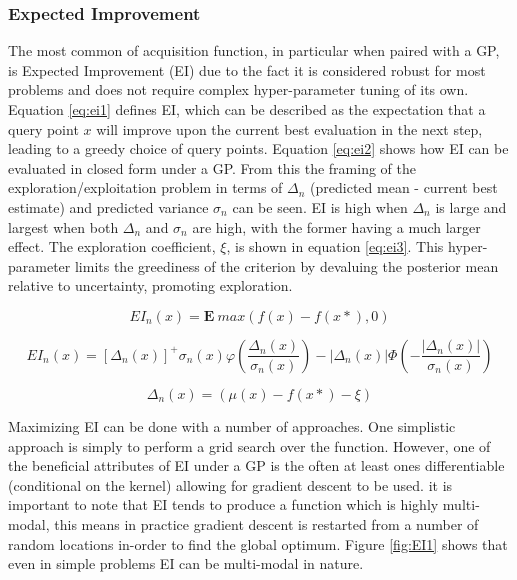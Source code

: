 \documentclass{article}
\begin{document}
		\subsubsection{Expected Improvement}\label{EI}

			The most common of acquisition function, in particular when paired with a GP, is Expected Improvement (EI) due to the fact it is considered robust for most problems and does not require complex hyper-parameter tuning of its own. Equation \ref{eq:ei1} defines EI, which can be described as the expectation that a query point \(x\) will improve upon the current best evaluation in the next step, leading to a greedy choice of query points. Equation \ref{eq:ei2} shows how EI can be evaluated in closed form under a GP. From this the framing of the exploration/exploitation problem in terms of \(\Delta_n\) (predicted mean - current best estimate) and predicted variance \(\sigma_n\) can be seen. EI is high when \(\Delta_n\) is large and largest when both  \(\Delta_n\) and \(\sigma_n\) are high, with the former having a much larger effect. The exploration coefficient, \(\xi\), is shown in equation \ref{eq:ei3}. This hyper-parameter limits the greediness of the criterion by devaluing the posterior mean relative to uncertainty, promoting exploration.

			 

			\begin{equation}\label{eq:ei1} EI_n(x) = \mathbf{E} ~max(f(x) -f(x*),0)\end{equation}

			\begin{equation}\label{eq:ei2} EI_n(x) = [\Delta_n(x)]^+ \sigma_n(x)\varphi\left(\frac{\Delta_n(x)}{\sigma_n(x)}\right)  - |\Delta_n(x)| \Phi\left(-\frac{|\Delta_n(x)|}{\sigma_n(x)}\right)\end{equation}

			\begin{equation}\label{eq:ei3}\Delta_n(x) = (\mu(x) - f(x*) - \xi) \end{equation}


			Maximizing EI can be done with a number of approaches. One simplistic approach is simply to perform a grid search over the function. However, one of the beneficial attributes of EI under a GP is the often at least ones differentiable (conditional on the kernel) allowing for gradient descent to be used. it is important to note that EI tends to produce a function which is highly multi-modal, this means in practice gradient descent is restarted from a number of random locations in-order to find the global optimum. Figure \ref{fig:EI1} shows that even in simple problems EI can be multi-modal in nature.
				
\end{document}
